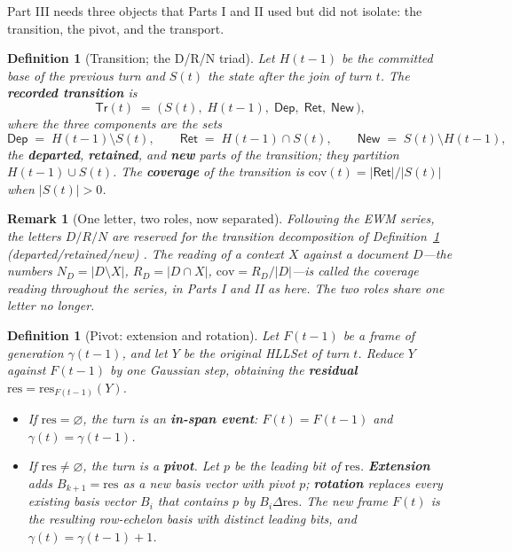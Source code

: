 \documentclass[11pt,a4paper]{article}
\newtheorem{definition}[principle]{Definition}
\newtheorem{remark}[principle]{Remark}
\theoremstyle{remark}
\newcommand{\xor}{\ensuremath{\Delta}}                   %
\newcommand{\res}{\ensuremath{\mathrm{res}}}             %
\newcommand{\Cov}{\ensuremath{\mathrm{cov}}}             %
\newcommand{\Gen}{\ensuremath{\gamma}}                   %
\newcommand{\Dep}{\ensuremath{\mathsf{Dep}}}             %
\newcommand{\Ret}{\ensuremath{\mathsf{Ret}}}             %
\newcommand{\New}{\ensuremath{\mathsf{New}}}             %
\newcommand{\Trans}{\ensuremath{\mathsf{Tr}}}            %
\begin{document}
Part III needs three objects that Parts I and II used but did not isolate:
the transition, the pivot, and the transport.

\begin{definition}[Transition; the D/R/N triad]
\label{def:transition}
Let $H(t{-}1)$ be the committed base of the previous turn and $S(t)$ the state
after the join of turn $t$. The \textbf{recorded transition} is
\[
  \Trans(t) \;=\; \bigl(\,S(t),\; H(t{-}1),\;
  \Dep,\; \Ret,\; \New\,\bigr),
\]
where the three components are the sets
\[
  \Dep \;=\; H(t{-}1) \setminus S(t), \qquad
  \Ret \;=\; H(t{-}1) \cap S(t), \qquad
  \New \;=\; S(t) \setminus H(t{-}1),
\]
the \textbf{departed}, \textbf{retained}, and \textbf{new} parts of the
transition; they partition $H(t{-}1) \cup S(t)$. The \textbf{coverage} of the
transition is $\Cov(t) = |\Ret|/|S(t)|$ when $|S(t)|>0$.
\end{definition}

\begin{remark}[One letter, two roles, now separated]
\label{rem:drn}
Following the EWM series, the letters $D/R/N$ are reserved for the
transition decomposition of Definition~\ref{def:transition}
(departed/retained/new) \cite{state2026}. The reading of a context $X$
against a document $D$---the numbers $N_D=|D\setminus X|$,
$R_D=|D\cap X|$, $\Cov=R_D/|D|$---is called the \emph{coverage reading}
throughout the series, in Parts I and II as here. The two roles share one
letter no longer.
\end{remark}

\begin{definition}[Pivot: extension and rotation]
\label{def:pivot}
Let $F(t{-}1)$ be a frame of generation $\Gen(t{-}1)$, and let $Y$ be the
original HLLSet of turn $t$. Reduce $Y$ against $F(t{-}1)$ by one Gaussian
step, obtaining the \textbf{residual} $\res = \res_{F(t{-}1)}(Y)$.
\begin{itemize}[leftmargin=*,nosep]
  \item If $\res = \varnothing$, the turn is an \textbf{in-span event}:
    $F(t)=F(t{-}1)$ and $\Gen(t)=\Gen(t{-}1)$.
  \item If $\res \neq \varnothing$, the turn is a \textbf{pivot}. Let $p$ be
    the leading bit of $\res$. \textbf{Extension} adds $B_{k+1}=\res$ as a new
    basis vector with pivot $p$; \textbf{rotation} replaces every existing
    basis vector $B_i$ that contains $p$ by $B_i \xor \res$. The new frame
    $F(t)$ is the resulting row-echelon basis with distinct leading bits, and
    $\Gen(t)=\Gen(t{-}1)+1$.
\end{itemize}
\end{definition}
\end{document}
